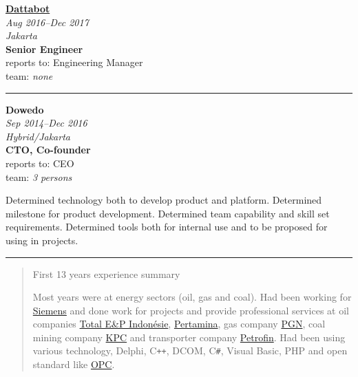 \documentclass[12pt]{res} %
\begin{document}
\begin{resume}
\begin{minipage}{6cm}
	{\bf \href{https://dattabot.io}{Dattabot}}\\
	{\footnotesize{\sl Aug 2016--Dec 2017}} \\
	{\footnotesize{\sl Jakarta}} \\	
	{\bf Senior Engineer} \\
	{\footnotesize reports to: Engineering Manager} \\
	{\footnotesize team: \emph{none}}
\end{minipage}
\begin{center}
	\rule{0.5\textwidth}{.2pt}
\end{center}
\vspace{16pt} %
\begin{minipage}{6cm}
	\begin{flushright}
		{\bf Dowedo} \\
		{\footnotesize{\sl Sep 2014--Dec 2016}}\\
		{\footnotesize{\sl Hybrid/Jakarta}}\\
		{\bf CTO, Co-founder} \\
		{\footnotesize reports to: CEO} \\
		{\footnotesize team: \emph{3 persons}}
	\end{flushright}
\end{minipage}
\hspace{1cm}
\begin{minipage}{0.59\linewidth}
	Determined technology both to develop product and platform.
	Determined milestone for product development.
	Determined team capability and skill set requirements.
	Determined tools both for internal use and to be proposed for using in projects.
\end{minipage}
\begin{center}
	\rule{0.5\textwidth}{.2pt}
\end{center}
\begin{quotation}
	\begin{center}
		{\large First 13 years experience summary}
	\end{center}
	\vspace{10pt} %
	Most years were at energy sectors (oil, gas and coal).
	Had been working for \href{https://siemens.co.id}{Siemens} and done work for projects and provide professional services at oil 
	companies \href{https://totalenergies.id}{Total E\&P Indonésie}, \href{https://pertamina.com}{Pertamina}, gas company \href{https://pgn.co.id}{PGN}, 
	coal mining company \href{https://kpc.co.id}{KPC} and transporter company \href{https://elnusapetrofin.co.id}{Petrofin}.
	Had been using various technology, Delphi, C\texttt{++}, DCOM, C\texttt{\#}, Visual Basic, PHP and open standard like \href{https://opcfoundation.org}{OPC}.


\end{quotation}
\end{resume}
\end{document}

